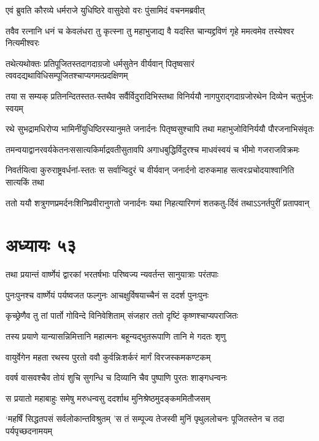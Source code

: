 \twolineshloka
{एवं ब्रुवति कौरव्ये धर्मराजे युधिष्ठिरे}
{वासुदेवो वरः पुंसामिदं वचनमब्रवीत्}


\twolineshloka
{तवैव रत्नानि धनं च केवलंधरा तु कृत्स्ना तु महाभुजाद्य वै}
{यदस्ति चान्यद्द्रविणं गृहे ममत्वमेव तस्येश्वर नित्यमीश्वरः}


\twolineshloka
{तथेत्यथोक्तः प्रतिपूजितस्तदागदाग्रजो धर्मसुतेन वीर्यवान्}
{पितृष्वसारं त्ववदद्यथाविधिसम्पूजितश्चाप्यगमत्प्रदक्षिणम्}


\twolineshloka
{तया स सम्यक् प्रतिनन्दितस्तत-स्तथैव सर्वैर्विदुरादिभिस्तथा}
{विनिर्ययौ नागपुराद्गदाग्रजोरथेन दिव्येन चतुर्भुजः स्वयम्}


\twolineshloka
{रथे सुभद्रामधिरोप्य भामिनींयुधिष्ठिरस्यानुमते जनार्दनः}
{पितृष्वसुश्चापि तथा महाभुजोविनिर्ययौ पौरजनाभिसंवृतः}


\twolineshloka
{तमन्वयाद्वानरवर्यकेतनःससात्यकिर्माद्रवतीसुतावपि}
{अगाधबुद्धिर्विदुरश्च माधवंस्वयं च भीमो गजराजविक्रमः}


\twolineshloka
{निवर्तयित्वा कुरुराष्ट्रवर्धनां-स्ततः स सर्वान्विदुरं च वीर्यवान्}
{जनार्दनो दारुकमाह सत्वरःप्रचोदयाश्वानिति सात्यकिं तथा}


\twolineshloka
{ततो ययौ शत्रुगणप्रमर्दनःशिनिप्रवीरानुगतो जनार्दनः}
{यथा निहत्यारिगणं शतकतु-र्दिवं तथाऽऽनर्तपुरीं प्रतापवान्}


\chapter{अध्यायः ५३}
\twolineshloka
{तथा प्रयान्तं वार्ष्णेयं द्वारकां भरतर्षभाः}
{परिष्वज्य न्यवर्तन्त सानुयात्राः परंतपाः}


\twolineshloka
{पुनःपुनश्च वार्ष्णेयं पर्यष्वजत फल्गुनः}
{आचक्षुर्विषयाच्चैनं स ददर्श पुनःपुनः}


\twolineshloka
{कृच्छ्रेणैव तु तां पार्तो गोविन्दे विनिवेशिताम्}
{संजहार ततो दृष्टिं कृष्णश्चाप्यपराजितः}


\twolineshloka
{तस्य प्रयाणे यान्यासन्निमित्तानि महात्मनः}
{बहून्यद्भुतरूपाणि तानि मे गदतः शृणु}


\twolineshloka
{वायुर्वेगेन महता रथस्य पुरतो ववौ}
{कुर्वन्निःशर्करं मार्गं विरजस्कमकण्टकम्}


\twolineshloka
{ववर्ष वासवश्चैव तोयं शुचि सुगन्धि च}
{दिव्यानि चैव पुष्पाणि पुरतः शाङ्गधन्वनः}


\twolineshloka
{स प्रयातो महाबाहुः समेषु मरुधन्वसु}
{ददर्शाथ मुनिश्रेष्ठमुदङ्कममितौजसम्}


\threelineshloka
{`महर्षिं सिद्धतपसं सर्वलोकान्तविश्रुतम्}
{'स तं सम्पूज्य तेजस्वी मुनिं पृथुललोचनः}
{पूजितस्तेन च तदा पर्यपृच्छदनामयम्}


